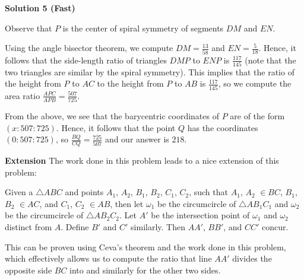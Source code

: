 \begin{enumerate}
\textbf{Solution 5 (Fast)}

Observe that $P$ is the center of spiral symmetry of segments $DM$ and $EN$. 

 Using the angle bisector theorem, we compute $DM = \frac{13}{58}$ and $EN = \frac{5}{18}$. Hence, it follows that the side-length ratio of triangles $DMP$ to $ENP$ is $\frac{117}{145}$ (note that the two triangles are similar by the spiral symmetry). This implies that the ratio of the height from $P$ to $AC$ to the height from $P$ to $AB$ is $\frac{117}{145}$, so we compute the area ratio $\frac{APC}{APB} = \frac{507}{725}$. 

 From the above, we see that the barycentric coordinates of $P$ are of the form $(x : 507 : 725)$. Hence, it follows that the point $Q$ has the coordinates $(0 : 507 : 725)$, so $\frac{BQ}{CQ} = \frac{725}{507}$ and our answer is $\boxed{218}$.

 \textbf{Extension} The work done in this problem leads to a nice extension of this problem:

 Given a $\triangle ABC$ and points $A_1$, $A_2$, $B_1$, $B_2$, $C_1$, $C_2$, such that $A_1$, $A_2$ $\in BC$, $B_1$, $B_2$ $\in AC$, and $C_1$, $C_2$ $\in AB$, then let $\omega_1$ be the circumcircle of $\triangle AB_1C_1$ and $\omega_2$ be the circumcircle of $\triangle AB_2C_2$. Let $A'$ be the intersection point of $\omega_1$ and $\omega_2$ distinct from $A$. Define $B'$ and $C'$ similarly. Then $AA'$, $BB'$, and $CC'$ concur. 

 This can be proven using Ceva's theorem and the work done in this problem, which effectively allows us to compute the ratio that line $AA'$ divides the opposite side $BC$ into and similarly for the other two sides.

 


\end{enumerate}